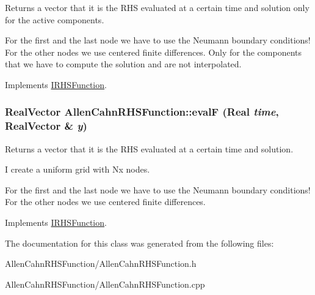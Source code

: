 Returns a vector that it is the RHS evaluated at a certain time and solution only for the active components. 

For the first and the last node we have to use the Neumann boundary conditions! For the other nodes we use centered finite differences. Only for the components that we have to compute the solution and are not interpolated.

Implements \hyperlink{classIRHSFunction}{IRHSFunction}.\hypertarget{classAllenCahnRHSFunction_a88cc6858ebc041f62edf9b3fc0505849}{
\subsubsection[{evalF}]{\setlength{\rightskip}{0pt plus 5cm}RealVector AllenCahnRHSFunction::evalF (Real {\em time}, \/  RealVector \& {\em y})}}
\label{classAllenCahnRHSFunction_a88cc6858ebc041f62edf9b3fc0505849}


Returns a vector that it is the RHS evaluated at a certain time and solution. 

I create a uniform grid with Nx nodes.

For the first and the last node we have to use the Neumann boundary conditions! For the other nodes we use centered finite differences.

Implements \hyperlink{classIRHSFunction}{IRHSFunction}.

The documentation for this class was generated from the following files:\begin{DoxyCompactItemize}
\item 
AllenCahnRHSFunction/AllenCahnRHSFunction.h\item 
AllenCahnRHSFunction/AllenCahnRHSFunction.cpp\end{DoxyCompactItemize}
